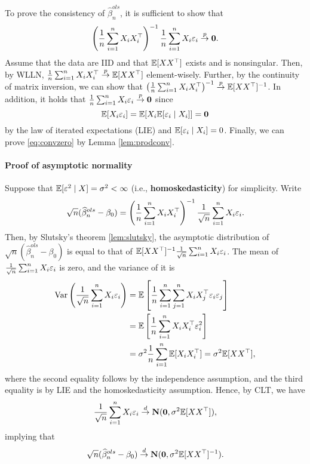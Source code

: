 \documentclass[11pt, A4paper, openany, uplatex]{book}
\begin{document}
To prove the consistency of $\hat \beta_n^{ols}$, it is sufficient to show that
\begin{align}\label{eq:convzero}
	\left(\frac{1}{n}\sum_{i = 1}^n X_i X_i^\top \right)^{-1}\frac{1}{n}\sum_{i = 1}^n X_i \varepsilon_i \overset{p}{\to} \mathbf{0}.
\end{align}
Assume that the data are IID and that $\mathbb{E}[XX^\top]$ exists and is nonsingular.
Then, by WLLN, $\frac{1}{n}\sum_{i = 1}^n X_i X_i^\top \overset{p}{\to} \mathbb{E}[XX^\top]$ element-wisely.
Further, by the continuity of matrix inversion, we can show that $\left(\frac{1}{n}\sum_{i = 1}^n X_i X_i^\top \right)^{-1} \overset{p}{\to} \mathbb{E}[XX^\top]^{-1}$.
In addition, it holds that $\frac{1}{n}\sum_{i = 1}^n X_i \varepsilon_i \overset{p}{\to} \mathbf{0}$ since
\[
	\mathbb{E}[X_i \varepsilon_i ] = \mathbb{E}[X_i \mathbb{E}[\varepsilon_i \mid X_i]] = \mathbf{0}
\]
by the law of iterated expectations (LIE) and $\mathbb{E}[\varepsilon_i \mid X_i] = 0$.
Finally, we can prove \eqref{eq:convzero} by Lemma \ref{lem:prodconv}.

\paragraph{Proof of asymptotic normality}
Suppose that $\mathbb{E}[\varepsilon^2 \mid X ] = \sigma^2 < \infty$ (i.e., \textbf{homoskedasticity}) for simplicity.
Write
\[
	\sqrt{n}(\widehat \beta_n^{ols} - \beta_0) = \left(\frac{1}{n}\sum_{i = 1}^n X_i X_i^\top \right)^{-1}\frac{1}{\sqrt{n}}\sum_{i = 1}^n X_i \varepsilon_i.
\]
Then, by Slutsky's theorem \ref{lem:slutsky}, the asymptotic distribution of  $\sqrt{n}(\hat \beta_n^{ols} - \beta_0)$ is equal to that of $\mathbb{E}[XX^\top]^{-1}\frac{1}{\sqrt{n}}\sum_{i = 1}^n X_i \varepsilon_i$.
The mean of $\frac{1}{\sqrt{n}}\sum_{i = 1}^n X_i \varepsilon_i$ is zero, and the variance of it is
\begin{align*}
	\mathrm{Var}\left(\frac{1}{\sqrt{n}}\sum_{i = 1}^n X_i \varepsilon_i\right) 
	& = \mathbb{E}\left[ \frac{1}{n}\sum_{i = 1}^n\sum_{j = 1}^n X_i X_j^\top \varepsilon_i \varepsilon_j \right]\\
	& = \mathbb{E}\left[ \frac{1}{n}\sum_{i = 1}^n X_iX_i^\top \varepsilon^2_i \right]\\
	& = \sigma^2 \frac{1}{n}\sum_{i = 1}^n  \mathbb{E}[  X_iX_i^\top ] = \sigma^2 \mathbb{E}[  XX^\top ],
\end{align*}
where the second equality follows by the independence assumption, and the third equality is by LIE and the homoskedasticity assumption.
Hence, by CLT, we have
\[
	\frac{1}{\sqrt{n}}\sum_{i = 1}^n X_i \varepsilon_i \overset{d}{\to} \mathbf{N}(\mathbf{0}, \sigma^2 \mathbb{E}[XX^\top]),
\]
implying that 
\[
	\sqrt{n}(\widehat \beta_n^{ols} - \beta_0) \overset{d}{\to} \mathbf{N}(\mathbf{0}, \sigma^2 \mathbb{E}[XX^\top]^{-1}).
\]
\end{document}
